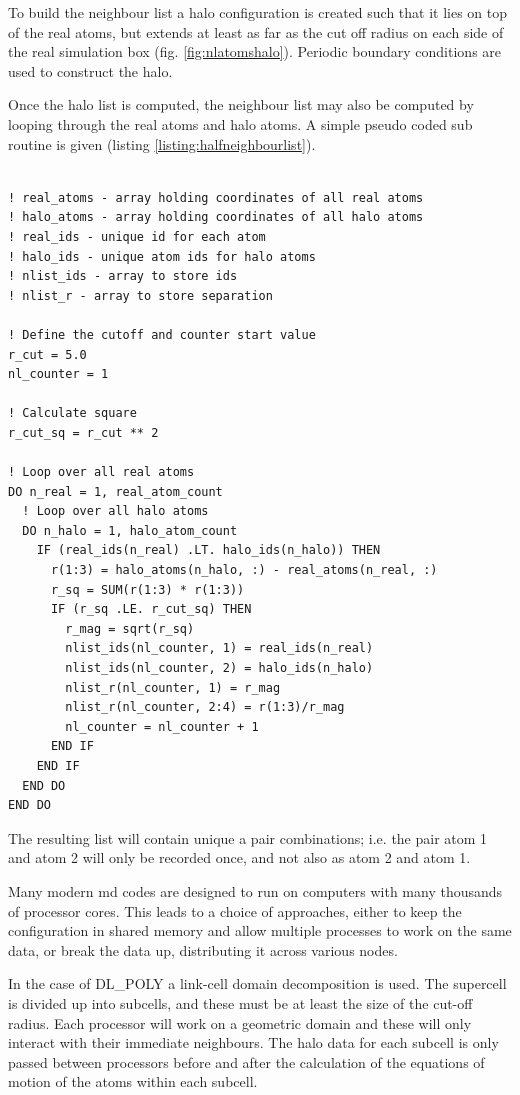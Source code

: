 To build the neighbour list a halo configuration is created such that it lies on top of the real atoms, but extends at least as far as the cut off radius on each side of the real simulation box (fig. \ref{fig:nlatomshalo}).  Periodic boundary conditions are used to construct the halo.

Once the halo list is computed, the neighbour list may also be computed by looping through the real atoms and halo atoms.  A simple pseudo coded sub routine is given (listing \ref{listing:halfneighbourlist}).

\FloatBarrier
\begin{lstlisting}[style=sFortran,caption={Simple subroutine for generating a half size neighbour list},label={listing:halfneighbourlist}]

! real_atoms - array holding coordinates of all real atoms
! halo_atoms - array holding coordinates of all halo atoms
! real_ids - unique id for each atom
! halo_ids - unique atom ids for halo atoms
! nlist_ids - array to store ids
! nlist_r - array to store separation

! Define the cutoff and counter start value
r_cut = 5.0
nl_counter = 1

! Calculate square
r_cut_sq = r_cut ** 2

! Loop over all real atoms
DO n_real = 1, real_atom_count
  ! Loop over all halo atoms
  DO n_halo = 1, halo_atom_count
    IF (real_ids(n_real) .LT. halo_ids(n_halo)) THEN
      r(1:3) = halo_atoms(n_halo, :) - real_atoms(n_real, :)
      r_sq = SUM(r(1:3) * r(1:3))
      IF (r_sq .LE. r_cut_sq) THEN          
        r_mag = sqrt(r_sq)          
        nlist_ids(nl_counter, 1) = real_ids(n_real)
        nlist_ids(nl_counter, 2) = halo_ids(n_halo)        
        nlist_r(nl_counter, 1) = r_mag
        nlist_r(nl_counter, 2:4) = r(1:3)/r_mag
        nl_counter = nl_counter + 1
      END IF
    END IF
  END DO
END DO 
\end{lstlisting}

The resulting list will contain unique a pair combinations; i.e. the pair atom 1 and atom 2 will only be recorded once, and not also as atom 2 and atom 1.

Many modern \acrshort{md} codes are designed to run on computers with many thousands of processor cores.  This leads to a choice of approaches, either to keep the configuration in shared memory and allow multiple processes to work on the same data, or break the data up, distributing it across various nodes.    

In the case of DL\_POLY a link-cell domain decomposition is used\cite{dlpolymanual}.  The supercell is divided up into subcells, and these must be at least the size of the cut-off radius.   Each processor will work on a geometric domain and these will only interact with their immediate neighbours.  The halo data for each subcell is only passed between processors before and after the calculation of the equations of motion of the atoms within each subcell.

